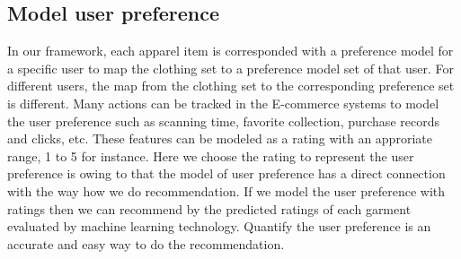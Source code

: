 \subsection{Model user preference}
In our framework, each apparel item is corresponded with a preference model for a specific user to map the clothing set to a preference model set of that user. For different users, the map from the clothing set to the corresponding preference set is different. Many actions can be tracked in the E-commerce systems to model the user preference such as scanning time, favorite collection, purchase records and clicks, etc. These features can be modeled as a rating with an approriate range, 1 to 5 for instance. Here we choose the rating to represent the user preference is owing to that the model of user preference has a direct connection with the way how we do recommendation. If we model the user preference with ratings then we can recommend by the predicted ratings of each garment evaluated by machine learning technology. Quantify the user preference is an accurate and easy way to do the recommendation. 

